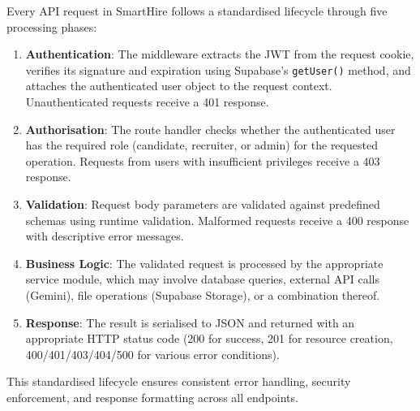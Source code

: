 Every API request in SmartHire follows a standardised lifecycle through five processing phases:

\begin{enumerate}[leftmargin=1.5em]
  \item \textbf{Authentication}: The middleware extracts the JWT from the request cookie, verifies its signature and expiration using Supabase's \texttt{getUser()} method, and attaches the authenticated user object to the request context. Unauthenticated requests receive a 401 response.

  \item \textbf{Authorisation}: The route handler checks whether the authenticated user has the required role (candidate, recruiter, or admin) for the requested operation. Requests from users with insufficient privileges receive a 403 response.

  \item \textbf{Validation}: Request body parameters are validated against predefined schemas using runtime validation. Malformed requests receive a 400 response with descriptive error messages.

  \item \textbf{Business Logic}: The validated request is processed by the appropriate service module, which may involve database queries, external API calls (Gemini), file operations (Supabase Storage), or a combination thereof.

  \item \textbf{Response}: The result is serialised to JSON and returned with an appropriate HTTP status code (200 for success, 201 for resource creation, 400/401/403/404/500 for various error conditions).
\end{enumerate}

This standardised lifecycle ensures consistent error handling, security enforcement, and response formatting across all endpoints.
